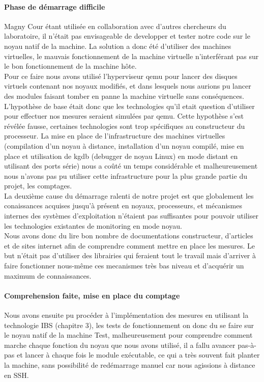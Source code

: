 		\paragraph{Phase de démarrage difficile}
			Magny Cour étant utilisée en collaboration avec d'autres chercheurs du laboratoire, il n'était pas envisageable de developper et tester notre code sur le noyau natif de la machine. La solution a donc été d'utiliser des machines virtuelles, le mauvais fonctionnement de la machine virtuelle n'interférant pas sur le bon fonctionnement de la machine hôte.\\
			Pour ce faire nous avons utilisé l'hyperviseur qemu pour lancer des disques virtuels contenant nos noyaux modifiés, et dans lesquels nous aurions pu lancer des modules faisant tomber en panne la machine virtuelle sans conséquences. L'hypothèse de base était donc que les technologies qu'il etait question d'utiliser pour effectuer nos mesures seraient simulées par qemu. Cette hypothèse s'est révélée fausse, certaines technologies sont trop spécifiques au constructeur du processeur. La mise en place de l'infrastructure des machines virtuelles (compilation d'un noyau à distance, installation d'un noyau compilé, mise en place et utilisation de kgdb (debugger de noyau Linux) en mode distant en utilisant des ports série) nous a coûté un temps considérable et malheureusement nous n'avons pas pu utiliser cette infrastructure pour la plus grande partie du projet, les comptages.\\
			La deuxième cause du démarrage ralenti de notre projet est que globalement les conaissances acquises jusqu'à présent en noyaux, processeurs, et mécanismes internes des systèmes d'exploitation n'étaient pas suffisantes pour pouvoir utiliser les technologies existantes de monitoring en mode noyau.\\
			Nous avons donc du lire bon nombre de documentations constructeur, d'articles et de sites internet afin de comprendre comment mettre en place les mesures. Le but n'était pas d'utiliser des librairies qui feraient tout le travail mais d'arriver à faire fonctionner nous-même ces mecanismes très bas niveau et d'acquérir un maximum de connaissances.
		\paragraph{Comprehension faite, mise en place du comptage}
			Nous avons ensuite pu procéder à l'implémentation des mesures en utilisant la technologie IBS (chapitre 3), les tests de fonctionnement on donc du se faire sur le noyau natif de la machine Test, malheureusement pour comprendre comment marche chaque fonction du noyau que nous avons utilisé, il a fallu avancer pas-à-pas et lancer à chaque fois le module exécutable, ce qui a très souvent fait planter la machine, sans possibilité de redémarrage manuel car nous agissions à distance en SSH.
